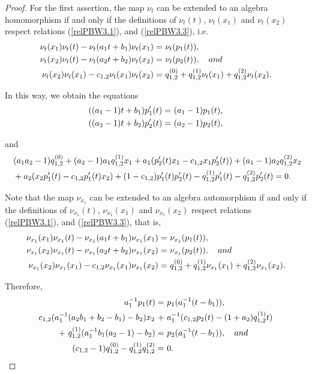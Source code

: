 \documentclass{amsart}
\theoremstyle{definition}
\theoremstyle{remark}
\numberwithin{equation}{section}
\begin{document}
\begin{proof}
For the first assertion, the map $\nu_t$ can be extended to an algebra homomorphism if and only if the definitions of $\nu_t(t)$, $\nu_t(x_1)$ and $\nu_t(x_2)$ respect relations {\rm (}\ref{relPBW3.1}{\rm )}, and {\rm (}\ref{relPBW3.3}{\rm )}, i.e.
\begin{align*}
   \nu_t(x_1)\nu_t(t)-\nu_t(a_1t+b_1)\nu_t(x_1) = &\ \nu_t(p_1(t)), \\
   \nu_t(x_2)\nu_t(t)-\nu_t(a_2t+b_2)\nu_t(x_2) = &\ \nu_t(p_2(t)), \quad {\rm and} \\
   \nu_t(x_2)\nu_t(x_1)-c_{1,2}\nu_t(x_1)\nu_t(x_2) = &\ q_{1,2}^{(0)}+q_{1,2}^{(1)}\nu_t(x_1)+q_{1,2}^{(2)}\nu_t(x_2).
\end{align*}

In this way, we obtain the equations 
\begin{align}
((a_1-1)t+b_1)p_1'(t) = &\ (a_1-1)p_1(t), \notag \\
((a_2-1)t+b_2)p_2'(t) = &\ (a_2-1)p_2(t), \label{firstsecondrel}
\end{align}

and
\begin{align}
   &\ (a_1a_2-1)q_{1,2}^{(0)} + (a_2-1)a_1q_{1,2}^{(1)}x_1 + a_1(p_2'(t)x_1-c_{1,2}x_1p_2'(t)) + (a_1-1)a_2q_{1,2}^{(2)}x_2 \notag \\ 
   &\ + a_2(x_2p_1'(t)-c_{1,2}p_1'(t)x_2) + (1-c_{1,2})p_1'(t)p_2'(t)-q_{1,2}^{(1)}p_1'(t)-q_{1,2}^{(2)}p_2'(t)=0. \label{thirdrel}
\end{align}

Note that the map $\nu_{x_1}$ can be extended to an algebra automorphism if and only if the definitions of $\nu_{x_1}(t)$, $\nu_{x_1}(x_1)$ and $\nu_{x_1}(x_2)$ respect relations {\rm (}\ref{relPBW3.1}{\rm )}, and {\rm (}\ref{relPBW3.3}{\rm )}, that is, 
\begin{align*}
   \nu_{x_1}(x_1)\nu_{x_1}(t)-\nu_{x_1}(a_1t+b_1)\nu_{x_1}(x_1) = &\ \nu_{x_1}(p_1(t)), \\
   \nu_{x_1}(x_2)\nu_{x_1}(t)-\nu_{x_1}(a_2t+b_2)\nu_{x_1}(x_2) = &\ \nu_{x_1}(p_2(t)),\quad {\rm and} \\
   \nu_{x_1}(x_2)\nu_{x_1}(x_1)-c_{1,2}\nu_{x_1}(x_1)\nu_{x_1}(x_2) = &\ q_{1,2}^{(0)}+q_{1,2}^{(1)}\nu_{x_1}(x_1)+q_{1,2}^{(2)}\nu_{x_1}(x_2).
\end{align*}

Therefore, 
\begin{align}
   a_{1}^{-1}p_1(t) = &\ p_1(a_{1}^{-1}(t-b_1)), \label{Firstnux1} \\
   c_{1,2}(a_1^{-1}(a_2b_1+b_2-b_1)-b_2)x_2\ + &\ a_1^{-1}(c_{1,2}p_2(t)-(1+a_2)q_{1,2}^{(1)}t) \notag \\
   +\ q_{1,2}^{(1)}(a_1^{-1}b_1(a_2-1)-b_2) = &\ p_2(a_1^{-1}(t-b_1)), \quad {\rm and} \label{Secondnux1}\\
   (c_{1,2}-1)q_{1,2}^{(0)}-q_{1,2}^{(1)}q_{1,2}^{(2)} = &\ 0. \label{Thirnux1}
\end{align}


\end{proof}
\end{document}
